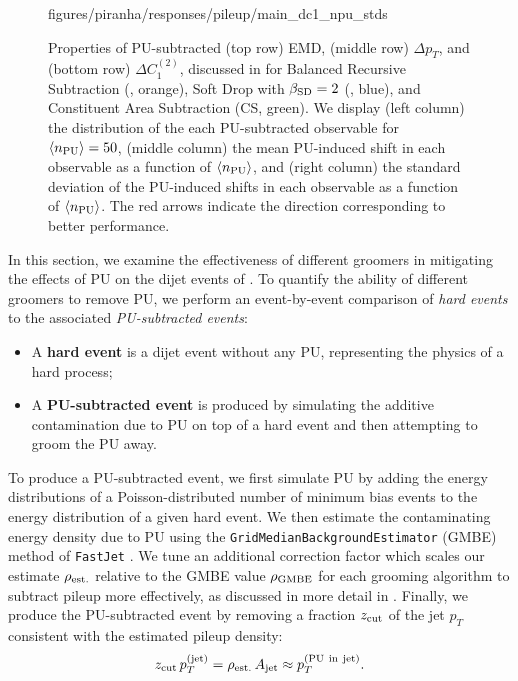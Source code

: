\begin{figure}[p]
{{      {figures/piranha/responses/pileup/main_dc1_npu_stds}
      \label{fig:pu_c12_std}
}
} %
\caption{
    Properties of PU-subtracted (top row) EMD, (middle row) \(\Delta p_T\), and (bottom row) \(\Delta C_1^{(2)}\), discussed in  for Balanced Recursive Subtraction (, orange), Soft Drop with \(\beta_{\rm SD} = 2\) (, blue), and Constituent Area Subtraction (CS, green).
    We display (left column) the distribution of the each PU-subtracted observable for \(\langle n_{\rm PU}\rangle = 50\), (middle column) the mean PU-induced shift in each observable as a function of \(\langle n_{\rm PU}\rangle\), and (right column) the standard deviation of the PU-induced shifts in each observable as a function of \(\langle n_{\rm PU}\rangle\).
    The red arrows indicate the direction corresponding to better performance.
}
\label{fig:pu_response}
\centering
\end{figure}

In this section, we examine the effectiveness of different groomers in mitigating the effects of PU on the dijet events of .
%
To quantify the ability of different groomers to remove PU, we perform an event-by-event comparison of \textit{hard events} to the associated \textit{PU-subtracted events}:
\begin{itemize}
    \item
    A \textbf{hard event} is a dijet event without any PU, representing the physics of a hard process;

    \item
    A \textbf{PU-subtracted event} is produced by simulating the additive contamination due to PU on top of a hard event and then attempting to groom the PU away.
\end{itemize}
%
To produce a PU-subtracted event, we first simulate PU by adding the energy distributions of a Poisson-distributed number of minimum bias events to the energy distribution of a given hard event.
    We then estimate the contaminating energy density due to PU using the \texttt{GridMedianBackgroundEstimator} (GMBE) method of \texttt{FastJet} \cite{Cacciari:2011ma}.
    We tune an additional correction factor which scales our estimate \(\rho_{\rm est.}\) relative to the GMBE value \(\rho_{\rm GMBE}\) for each grooming algorithm to subtract pileup more effectively, as discussed in more detail in .
    Finally, we produce the PU-subtracted event by removing a fraction \(z_{\rm cut}\) of the jet \(p_T\) consistent with the estimated pileup density:
\begin{align}
   z_{\rm cut}\,p_T^{\rm(jet)}
   =
   \rho_{\rm est.}\,A_{\rm jet}
   \approx
   p_T^{\rm(PU~in~jet)}
   .
\end{align}

